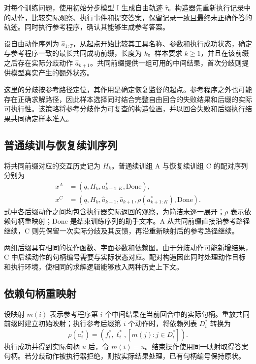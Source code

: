 对每个训练问题，使用初始分步模型 I 生成自由轨迹 $\hat\tau$。构造器先重新执行记录中的动作，比较实际观察、执行事件和提交答案，保留记录一致且最终未正确作答的轨迹。同时执行参考程序，确认其能够生成参考答案。

设自由动作序列为 $\hat a_{1:T}$，从起点开始比较其工具名称、参数和执行成功状态，确定与参考程序一致的最长共同成功前缀，长度为 $k$。样本要求 $k\geq1$，并且在该前缀之后存在实际分歧动作 $\hat a_{k+1}$。共同前缀提供一组可用的中间结果，首次分歧则提供模型真实产生的额外状态。

这里的分歧按参考路径定位，其作用是确定恢复监督的起点。参考程序之外也可能存在正确求解路径，因此样本选择同时结合完整自由回合的失败结果和后缀的实际可执行性。该策略将参考分歧作为可复查的构造位置，并以回合失败和后缀执行结果共同确定样本准入。

\subsection{普通续训与恢复续训序列}

将共同前缀对应的交互历史记为 $H_k$。普通续训组 A 与恢复续训组 C 的配对序列分别为
\begin{align}
  x^A &= (q,H_k,a^*_{k+1:K},\mathrm{Done}), \\
  x^C &= (q,H_k,\hat a_{k+1},\hat o_{k+1},
                 \rho(a^*_{k+1:K}),\mathrm{Done}).
\end{align}
式中各后缀动作之间均包含执行器实际返回的观察，为简洁未逐一展开；$\rho$ 表示依赖句柄重映射；$\mathrm{Done}$ 是结束训练序列的助手文本。A 从共同前缀直接沿参考路径继续，C 则先保留一次实际分歧及其反馈，再沿重新映射后的参考路径继续。

两组后缀具有相同的操作函数、字面参数和依赖图。由于分歧动作可能新增结果，C 中后续动作的句柄编号需要与实际状态对应。配对构造因此同时处理动作目标和执行环境，使相同的求解逻辑能够放入两种历史上下文。

\subsection{依赖句柄重映射}

设映射 $m(i)$ 表示参考程序第 $i$ 个中间结果在当前回合中的实际句柄。重放共同前缀时建立初始映射；执行参考后缀第 $i$ 个动作时，将依赖列表 $D_i^*$ 转换为
\begin{equation}
  \rho(a_i^*)=
  \left(f_i^*,\ell_i^*,[m(j):j\in D_i^*]\right).
\end{equation}
执行成功并得到实际句柄 $u$ 后，令 $m(i)=u$。结束操作使用同一映射取得答案句柄。若分歧动作被执行器拒绝，则按实际结果处理，已有句柄编号保持原状。

